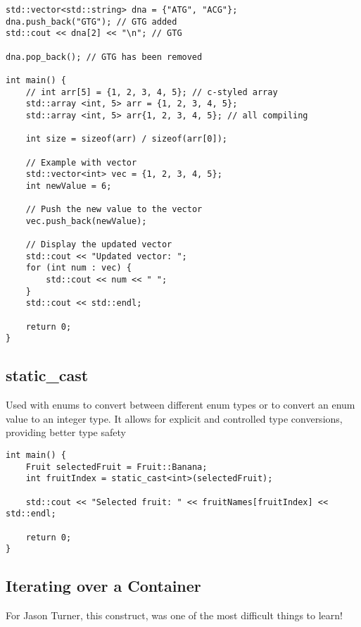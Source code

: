 \documentclass[openany]{report}
\begin{document}
\begin{verbatim}
std::vector<std::string> dna = {"ATG", "ACG"};
dna.push_back("GTG"); // GTG added
std::cout << dna[2] << "\n"; // GTG

dna.pop_back(); // GTG has been removed

int main() {
    // int arr[5] = {1, 2, 3, 4, 5}; // c-styled array
    std::array <int, 5> arr = {1, 2, 3, 4, 5};  
    std::array <int, 5> arr{1, 2, 3, 4, 5}; // all compiling

    int size = sizeof(arr) / sizeof(arr[0]);

    // Example with vector
    std::vector<int> vec = {1, 2, 3, 4, 5};
    int newValue = 6;

    // Push the new value to the vector
    vec.push_back(newValue);

    // Display the updated vector
    std::cout << "Updated vector: ";
    for (int num : vec) {
        std::cout << num << " ";
    }
    std::cout << std::endl;

    return 0;
}

\end{verbatim}

\subsection{static\_cast}

Used with enums to convert between different enum types or to convert an enum value to an integer type.
It allows for explicit and controlled type conversions, providing better type safety

\begin{verbatim}
int main() {
    Fruit selectedFruit = Fruit::Banana;
    int fruitIndex = static_cast<int>(selectedFruit);

    std::cout << "Selected fruit: " << fruitNames[fruitIndex] << std::endl;

    return 0;
}
\end{verbatim}

\subsection{Iterating over a Container}

For Jason Turner, this construct, was one of the most difficult things to learn!
\end{document}

